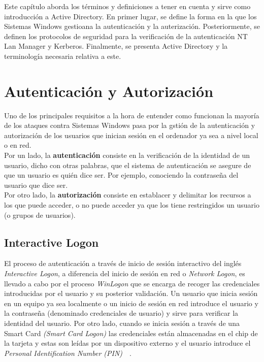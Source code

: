 Este capítulo aborda los términos y definiciones a tener en cuenta y sirve como introducción a Active Directory. En primer lugar, se define la forma en la que los Sistemas Windows gestioana la autenticación y la auterización. Posteriormente, se definen los protocolos de seguridad para la verificación de la autenticación NT Lan Manager y Kerberos. Finalmente, se presenta Active Directory y la terminología necesaria relativa a este.\\

\section{Autenticación y Autorización}

Uno de los principales requisitos a la hora de entender como funcionan la mayoría de los ataques contra Sistemas Windows pasa por la gstión de la autenticación y autorización de los usuarios que inician sesión en el ordenador ya sea a nivel local o en red.\\

Por un lado, la \textbf{autenticación} consiste en la verificación de la identidad de un usuario, dicho con otras palabras, que el sistema de autenticación se asegure de que un usuario es quién dice ser. Por ejemplo, conociendo la contraseña del usuario que dice ser.\\

Por otro lado, la \textbf{autorización} consiste en establacer y delimitar los recursos a los que puede acceder, o no puede acceder ya que los tiene restringidos un usuario (o grupos de usuarios).\\


\subsection{Interactive Logon}

El proceso de autenticación a través de inicio de sesión interactivo del inglés {\it Interactive Logon}, a diferencia del inicio de sesión en red o {\it Network Logon}, es llevado a cabo por el proceso {\it WinLogon} que se encarga de recoger las credenciales introducidas por el usuario y su posterior validación. Un usuario que inicia sesión en un equipo ya sea localmente o un inicio de sesión en red introduce el usuario y la contraseña (denominado credenciales de usuario) y sirve para verificar la identidad del usuario. Por otro lado, cuando se inicia sesión a través de una Smart Card {\it (Smart Card Logon)} las credenciales están almacenadas en el chip de la tarjeta y estas son leídas por un dispositivo externo y el usuario introduce el {\it Personal Identification Number (PIN)}~\cite{Capitulo2:Logon}~\cite{Capitulo2:Logon2}.\\

